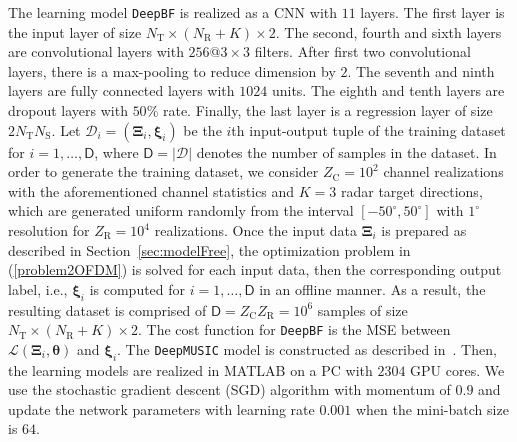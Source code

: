 \documentclass[journal,10pt]{IEEEtran}
\begin{document}
	{\color{black}The learning model \texttt{DeepBF} is realized as a CNN with $11$ layers. The first layer is the input layer of size $N_\mathrm{T}\times (N_\mathrm{R}+K)\times 2$. The second, fourth and sixth layers are convolutional layers with $256$@$3\times 3$ filters. After first two convolutional layers, there is a max-pooling to reduce dimension by $2$. The seventh and ninth layers are fully connected layers with $1024$ units. The eighth and tenth layers are dropout layers with $50\%$ rate. Finally, the last layer is a regression layer of size $2N_\mathrm{T}N_\mathrm{S}$. Let $\mathcal{D}_i = (\boldsymbol{\Xi}_i, \boldsymbol{\xi}_i)$ be the $i$th input-output tuple of the training dataset for $i = 1,\dots, \textsf{D}$, where $\textsf{D}= |\mathcal{D}|$ denotes the number of samples in the dataset. In order to generate the training dataset, we consider $Z_\mathrm{C}=10^2$ channel realizations with the aforementioned channel statistics and $K=3$ radar target directions, which are generated uniform randomly from the interval $[-50^\circ,50^\circ]$ with $1^\circ$ resolution for $Z_\mathrm{R} = 10^4$ realizations. Once the input data $\boldsymbol{\Xi}_i$ is prepared as described in Section~\ref{sec:modelFree}, the optimization problem in (\ref{problem2OFDM}) is solved for each input data, then the corresponding output label, i.e., $\boldsymbol{\xi}_i$ is computed for $i = 1,\dots, \textsf{D}$ in an offline manner. As a result, the resulting  dataset is comprised of $\textsf{D} = Z_\mathrm{C}Z_\mathrm{R} = 10^6$ samples of size $N_\mathrm{T}\times (N_\mathrm{R}+K)\times 2$. The cost function for \texttt{DeepBF} is the MSE between $\mathcal{L}(\boldsymbol{\Xi}_i, \boldsymbol{\theta})$ and $\boldsymbol{\xi}_i$. The \texttt{DeepMUSIC} model is constructed as described in~\cite{elbir_DL_MUSIC}.  Then, the learning models are realized in MATLAB on a PC with $2304$ GPU cores. We use the stochastic gradient descent (SGD) algorithm with momentum of $0.9$  and  update the network parameters with learning rate $0.001$ when the mini-batch size is $64$. }
	
	
	
	
	
\end{document}

